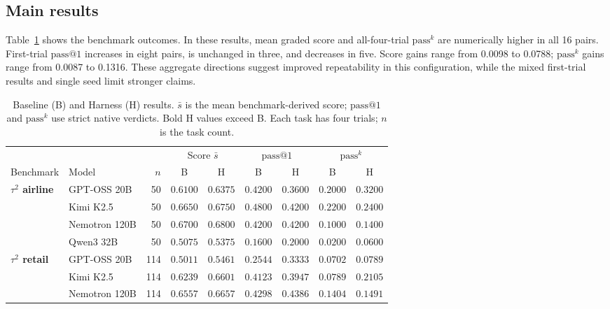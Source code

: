 \documentclass[11pt,letterpaper]{article}
\makeatletter
\newcommand{\passk}{\mathrm{pass}^{k}}
\newcommand{\passone}{\mathrm{pass@}1}
\makeatother
\begin{document}
\subsection{Main results}
\label{sec:main}
Table~\ref{tab:headline} shows the benchmark outcomes. In these
results, mean graded score and all-four-trial $\passk$ are numerically higher
in all 16 pairs. First-trial $\passone$ increases in eight pairs, is unchanged
in three, and decreases in five. Score gains range from 0.0098 to 0.0788;
$\passk$ gains range from 0.0087 to 0.1316. These aggregate directions
suggest improved repeatability in this configuration, while the mixed
first-trial results and single seed limit stronger claims.

\begin{table}[H]
\centering\scriptsize
\setlength{\tabcolsep}{3pt}
\caption{Baseline (B) and Harness (H) results. $\bar s$ is the mean
benchmark-derived score; $\passone$ and $\passk$ use strict native verdicts.
Bold H values exceed B. Each task has four trials; $n$ is the task count.}
\label{tab:headline}
\begin{tabular*}{\linewidth}{@{\extracolsep{\fill}}llrcccccc@{}}
\toprule
 & & & \multicolumn{2}{c}{Score $\bar s$} &
 \multicolumn{2}{c}{$\passone$} & \multicolumn{2}{c}{$\passk$} \\
\cmidrule(lr){4-5}\cmidrule(lr){6-7}\cmidrule(l){8-9}
Benchmark & Model & $n$ & B & H & B & H & B & H \\
\midrule
\textbf{$\tau^2$ airline} & GPT-OSS 20B & 50 & $0.6100$ & $\mathbf{0.6375}$ & $0.4200$ & $0.3600$ & $0.2000$ & $\mathbf{0.3200}$ \\
 & Kimi K2.5 & 50 & $0.6650$ & $\mathbf{0.6750}$ & $0.4800$ & $0.4200$ & $0.2200$ & $\mathbf{0.2400}$ \\
 & Nemotron 120B & 50 & $0.6700$ & $\mathbf{0.6800}$ & $0.4200$ & $0.4200$ & $0.1000$ & $\mathbf{0.1400}$ \\
 & Qwen3 32B & 50 & $0.5075$ & $\mathbf{0.5375}$ & $0.1600$ & $\mathbf{0.2000}$ & $0.0200$ & $\mathbf{0.0600}$ \\
\midrule
\textbf{$\tau^2$ retail} & GPT-OSS 20B & 114 & $0.5011$ & $\mathbf{0.5461}$ & $0.2544$ & $\mathbf{0.3333}$ & $0.0702$ & $\mathbf{0.0789}$ \\
 & Kimi K2.5 & 114 & $0.6239$ & $\mathbf{0.6601}$ & $0.4123$ & $0.3947$ & $0.0789$ & $\mathbf{0.2105}$ \\
 & Nemotron 120B & 114 & $0.6557$ & $\mathbf{0.6657}$ & $0.4298$ & $\mathbf{0.4386}$ & $0.1404$ & $\mathbf{0.1491}$ \\

\end{tabular*}
\end{table}
\end{document}
